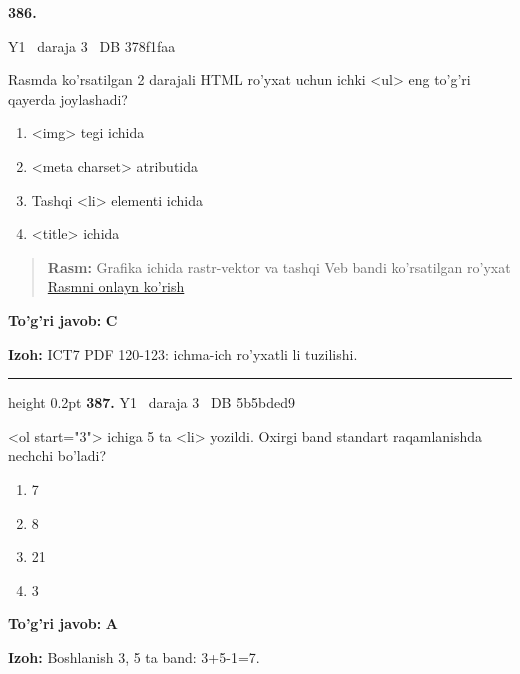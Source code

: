 \documentclass[10pt,a4paper,oneside]{article}
\begin{document}
\hypertarget{q386}{\textbf{\color{ink}386.}}  {\color{muted}\scriptsize Y1 \textbullet\ daraja 3 \textbullet\ DB 378f1faa}
\par
Rasmda ko'rsatilgan 2 darajali HTML ro'yxat uchun ichki \textless{}ul\textgreater{} eng to'g'ri qayerda joylashadi?
\begin{enumerate}[label=\Alph*),leftmargin=9mm]
\item \textless{}img\textgreater{} tegi ichida
\item \textless{}meta charset\textgreater{} atributida
\item Tashqi \textless{}li\textgreater{} elementi ichida
\item \textless{}title\textgreater{} ichida
\end{enumerate}
\begin{quote}\footnotesize\color{muted}\textbf{Rasm:} Grafika ichida rastr-vektor va tashqi Veb bandi ko'rsatilgan ro'yxat\\
\href{https://github.com/sarvar9417/attestatsiya/blob/main/public/graphics-web-v2/nested_list.svg}{Rasmni onlayn ko'rish}
\end{quote}
\begin{tcolorbox}[enhanced,breakable,colback=teal!4,colframe=teal!45!black,boxrule=0.45pt,arc=1.2mm,left=2.8mm,right=2.8mm,top=2mm,bottom=2mm,before skip=2mm,after skip=2mm]
\textbf{\color{teal}To'g'ri javob:} \textbf{C}
\par\smallskip
\textbf{Izoh:} ICT7 PDF 120-123: ichma-ich ro'yxatli li tuzilishi.
\end{tcolorbox}
\vspace{2mm}\hrule height 0.2pt \vspace{4mm}
\hypertarget{q387}{\textbf{\color{ink}387.}}  {\color{muted}\scriptsize Y1 \textbullet\ daraja 3 \textbullet\ DB 5b5bded9}
\par
\textless{}ol start="3"\textgreater{} ichiga 5 ta \textless{}li\textgreater{} yozildi. Oxirgi band standart raqamlanishda nechchi bo'ladi?
\begin{enumerate}[label=\Alph*),leftmargin=9mm]
\item 7
\item 8
\item 21
\item 3
\end{enumerate}
\begin{tcolorbox}[enhanced,breakable,colback=teal!4,colframe=teal!45!black,boxrule=0.45pt,arc=1.2mm,left=2.8mm,right=2.8mm,top=2mm,bottom=2mm,before skip=2mm,after skip=2mm]
\textbf{\color{teal}To'g'ri javob:} \textbf{A}
\par\smallskip
\textbf{Izoh:} Boshlanish 3, 5 ta band: 3+5-1=7.
\end{tcolorbox}
\end{document}
